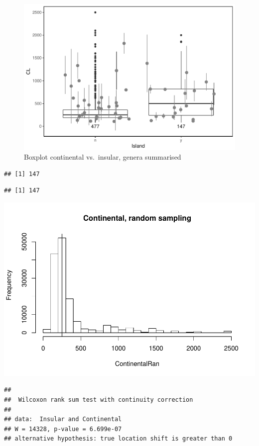 \documentclass[]{article}
\begin{document}
\begin{figure}[htbp]
\centering
\includegraphics{MA_JJ_files/figure-latex/BPCI-1.pdf}
\caption{Boxplot continental vs.~insular, genera summarised}
\end{figure}

\begin{verbatim}
## [1] 147
\end{verbatim}

\begin{verbatim}
## [1] 147
\end{verbatim}

\includegraphics{MA_JJ_files/figure-latex/RSCI-1.pdf}

\begin{verbatim}
## 
##  Wilcoxon rank sum test with continuity correction
## 
## data:  Insular and Continental
## W = 14328, p-value = 6.699e-07
## alternative hypothesis: true location shift is greater than 0
\end{verbatim}
\end{document}
